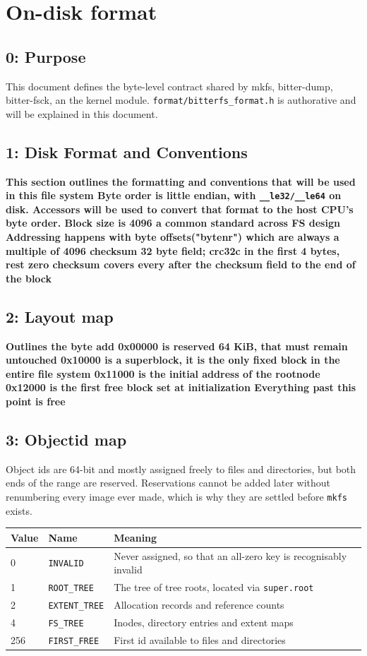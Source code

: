 \chapter{On-disk format}
\label{ch:ondisk}

\section{0: Purpose}
This document defines the byte-level contract shared by mkfs, bitter-dump, bitter-fsck, an the kernel module.
\lstinline|format/bitterfs_format.h| is authorative and will be explained in this document. 
\section{1: Disk Format and Conventions}
\bf{This section outlines the formatting and conventions that will be used in this file system}
Byte order is little endian, with \lstinline|__le32/__le64| on disk. 
Accessors will be used to convert that format to the 
host CPU's byte order.
Block size is 4096 a common standard across FS design
Addressing happens with byte offsets("bytenr") which are always a multiple of 4096
checksum 32 byte field; crc32c in the first 4 bytes, rest zero
checksum covers every after the checksum field to the end of the block
\section{2: Layout map}
\bf{Outlines the byte add}
0x00000 is reserved 64 KiB, that must remain untouched
0x10000 is a superblock, it is the only fixed block in the entire file system
0x11000 is the initial address of the rootnode
0x12000 is the first free block set at initialization
Everything past this point is free
\section{3: Objectid map}


Object ids are 64-bit and mostly assigned freely to files and directories, but
both ends of the range are reserved. Reservations cannot be added later without
renumbering every image ever made, which is why they are settled before
\texttt{mkfs} exists.

\begin{center}
\begin{tabular}{llp{7.6cm}}
  \toprule
  Value & Name & Meaning \\
  \midrule
  0     & \texttt{INVALID}     & Never assigned, so that an all-zero key is recognisably invalid \\
  1     & \texttt{ROOT\_TREE}   & The tree of tree roots, located via \texttt{super.root} \\
  2     & \texttt{EXTENT\_TREE} & Allocation records and reference counts \\
  4     & \texttt{FS\_TREE}     & Inodes, directory entries and extent maps \\
  256   & \texttt{FIRST\_FREE}  & First id available to files and directories \\
  \bottomrule
\end{tabular}
\end{center}

